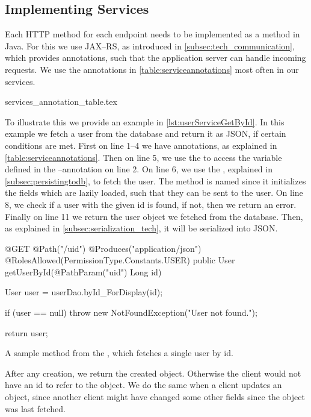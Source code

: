 \subsection{Implementing Services}\label{subsec:implementingservices}
Each HTTP method for each endpoint needs to be implemented as a method in Java.
For this we use JAX--RS, as introduced in \cref{subsec:tech_communication}, which provides annotations, such that the application server can handle incoming requests.
We use the annotations in \cref{table:serviceannotations} most often in our services.

{services_annotation_table.tex}

\bigskip
To illustrate this we provide an example in \cref{lst:userServiceGetById}.
In this example we fetch a user from the database and return it as JSON, if certain conditions are met.
First on line 1--4 we have annotations, as explained in \cref{table:serviceannotations}.
Then on line 5, we use the  to access the variable defined in the --annotation on line 2.
On line 6, we use the , explained in \cref{subsec:persistingtodb}, to fetch the user.
The method is named  since it initializes the fields which are lazily loaded, such that they can be sent to the user.
On line 8, we check if a user with the given id is found, if not, then we return an error.
Finally on line 11 we return the user object we fetched from the database.
Then, as explained in \cref{subsec:serialization_tech}, it will be serialized into JSON.
\begin{listing}
    \begin{java2}
@GET
@Path("/{uid}")
@Produces("application/json")
@RolesAllowed({PermissionType.Constants.USER})
public User getUserById(@PathParam("uid") Long id) {
    User user = userDao.byId_ForDisplay(id);

    if (user == null)
        throw new NotFoundException("User not found.");

    return user;
}
    \end{java2}
    \caption{A sample method from the , which fetches a single user by id.}\label{lst:userServiceGetById}
\end{listing}

After any creation, we return the created object.
Otherwise the client would not have an id to refer to the object.
We do the same when a client updates an object,
since another client might have changed some other fields since the object was last fetched.

